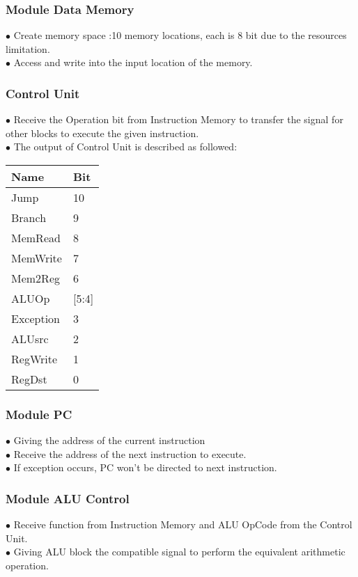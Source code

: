 \documentclass[12pt, a4paper, oneside]{article}
\begin{document}
    \subsubsection{Module Data Memory}
    $\bullet$ Create memory space :10 memory locations, each is 8 bit due to the resources limitation.\\
    $\bullet$ Access and write into the input location of the memory. 
    
    \subsubsection{Control Unit}
    $\bullet$ Receive the Operation bit from Instruction Memory to transfer the signal for other blocks to execute the given instruction.\\
    $\bullet$ The output of Control Unit is described as followed: \\
    \begin{center}
    \begin{tabular}{|l|l|}
    	\hline
    	Name & Bit \\ \hline
    	Jump & 10 \\ \hline
    	Branch & 9 \\ \hline
    	MemRead & 8 \\  \hline
    	MemWrite & 7 \\  \hline
    	Mem2Reg & 6 \\  \hline
    	ALUOp & [5:4] \\  \hline
    	Exception & 3 \\  \hline
    	ALUsrc & 2 \\  \hline
    	RegWrite & 1 \\  \hline
    	RegDst & 0 \\ \hline
    \end{tabular}
   \end{center} 
    
    \subsubsection{Module PC}
    $\bullet$ Giving the address of the current instruction \\
    $\bullet$ Receive the address of the next instruction to execute. \\
    $\bullet$ If exception occurs, PC won't be directed to next instruction.
    
     \subsubsection{Module ALU Control}
    $\bullet$ Receive function from Instruction Memory and ALU OpCode from the Control Unit.\\
    $\bullet$ Giving ALU block the compatible signal to perform the equivalent arithmetic operation. 
    
\end{document}

